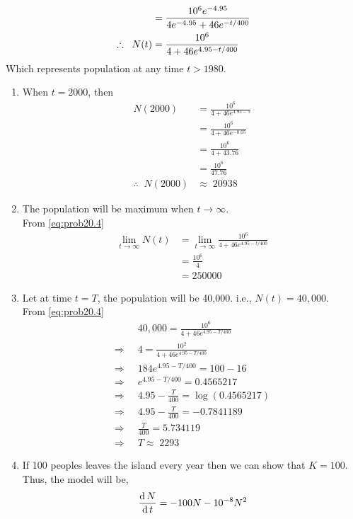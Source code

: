 \documentclass[../main-sheet.tex]{subfiles}
\begin{document}
\begin{soln}
\begin{align}
        &=\frac{10^6 e^{-4.95}}{4e^{-4.95}+46 e^{-t/400}}\notag\\
        \therefore\;\;N(t)&=\frac{10^6}{4+46 e^{4.95-t/400}}\label{eq:prob20.4}
    \end{align}
    Which represents population at any time \(t>1980\).
    \begin{enumerate}[label=(\roman*)]
        \item When \(t=2000\), then
        \begin{align*}
            N(2000)&=\frac{10^6}{4+46 e^{4.95-5}}\\
            &=\frac{10^6}{4+46 e^{-0.05}}\\
            &=\frac{10^6}{4+43.76}\\
            &=\frac{10^6}{47.76}\\
            \therefore\;\;N(2000)&\approx \;20938
        \end{align*}
        \item The population will be maximum when \(t\to \infty\).\\ From \eqref{eq:prob20.4}
        \begin{align*}
            \lim_{t\to\infty}N(t)&=\lim_{t\to\infty}\frac{10^6}{4+46e^{4.95-t/400}}\\
            &=\frac{10^6}{4}\\
            &=250000
        \end{align*}
        \item Let at time \(t=T\), the population will be 40,000. i.e., \(N(t)=40,000\).\\ From \eqref{eq:prob20.4}
        \begin{align*}
            &40,000=\frac{10^6}{4+46e^{4.95-T/400}}\\
            \Rightarrow\;\;&4=\frac{10^2}{4+46e^{4.95-T/400}}\\
            \Rightarrow\;\;&184e^{4.95-T/400}=100-16\\
            \Rightarrow\;\;&e^{4.95-T/400}=0.4565217\\
            \Rightarrow\;\;&4.95-\frac{T}{400}=\log(0.4565217)\\
            \Rightarrow\;\;&4.95-\frac{T}{400}=-0.7841189\\
            \Rightarrow\;\;&\frac{T}{400}=5.734119\\
            \Rightarrow\;\;&T \approx\;2293
        \end{align*}
        \item If 100 peoples leaves the island every year then we can show that \(K=100\). Thus, the model will be,
        \[\,\frac{\mathrm{d}\,N}{\mathrm{d}\,t}=-100N-10^{-8}N^2\]
    \end{enumerate}
\end{soln}
\end{document}
